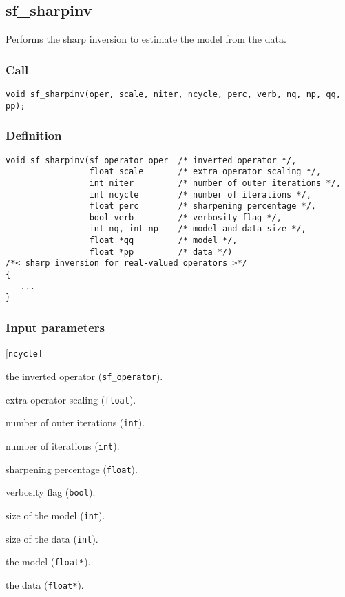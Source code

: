 \subsection{{sf\_sharpinv}}
Performs the sharp inversion to estimate the model from the data.

\subsubsection*{Call}
\begin{verbatim}
void sf_sharpinv(oper, scale, niter, ncycle, perc, verb, nq, np, qq, pp);
\end{verbatim}

\subsubsection*{Definition}
\begin{verbatim}
void sf_sharpinv(sf_operator oper  /* inverted operator */, 
                 float scale       /* extra operator scaling */,
                 int niter         /* number of outer iterations */,
                 int ncycle        /* number of iterations */,
                 float perc        /* sharpening percentage */,
                 bool verb         /* verbosity flag */,
                 int nq, int np    /* model and data size */,
                 float *qq         /* model */, 
                 float *pp         /* data */)
/*< sharp inversion for real-valued operators >*/
{
   ...
}
\end{verbatim}

\subsubsection*{Input parameters}
\begin{desclist}{\tt }{\quad}[\tt ncycle]
   \setlength\itemsep{0pt}
   \item[oper]   the inverted operator (\texttt{sf\_operator}). 
   \item[scale]  extra operator scaling (\texttt{float}). 
   \item[niter]  number of outer iterations (\texttt{int}). 
   \item[ncycle] number of iterations (\texttt{int}). 
   \item[perc]   sharpening percentage (\texttt{float}). 
   \item[verb]   verbosity flag (\texttt{bool}). 
   \item[nq]     size of the model (\texttt{int}).
   \item[np]     size of the data (\texttt{int}). 
   \item[qq]     the model (\texttt{float*}).
   \item[pp]     the data (\texttt{float*}).
\end{desclist}



